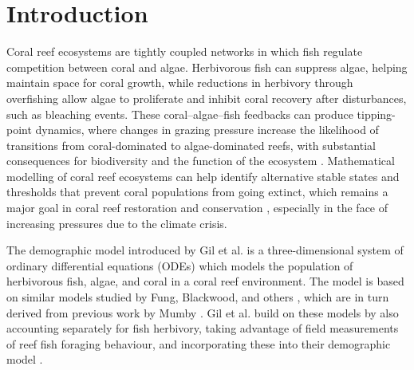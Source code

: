 \documentclass{article}
\theoremstyle{definition}
\numberwithin{equation}{section}
\begin{document}

\section{Introduction}
\label{sec: intro}
Coral reef ecosystems are tightly coupled networks in which fish regulate competition between coral and algae. Herbivorous fish can suppress algae, helping maintain space for coral growth, while reductions in herbivory through overfishing allow algae to proliferate and inhibit coral recovery after disturbances, such as bleaching events. These coral–algae–fish feedbacks can produce tipping-point dynamics, where changes in grazing pressure increase the likelihood of transitions from coral-dominated to algae-dominated reefs, with substantial consequences for biodiversity and the function of the ecosystem \cite{hughes_1994_catastrophes,mumby_2007_thresholds}.
Mathematical modelling of coral reef ecosystems can help identify alternative stable states and thresholds that prevent coral populations from going extinct, which remains a major goal in coral reef restoration and conservation \cite{suding_2009_threshold}, especially in the face of increasing pressures due to the climate crisis.

The demographic model introduced by Gil et al. is a three-dimensional system of ordinary differential equations (ODEs) which models the population of herbivorous fish, algae, and coral in a coral reef environment. The model is based on similar models studied by Fung, Blackwood, and others \cite{blackwood_2010_the, briggs_2018_macroalgae, fung_2011_alternative}, which are in turn derived from previous work by Mumby \cite{mumby_2007_thresholds}. Gil et al. build on these models by also accounting separately for fish herbivory, taking advantage of field measurements of reef fish foraging behaviour, and incorporating these into their demographic model \cite{gil_2017_social}.
\end{document}
